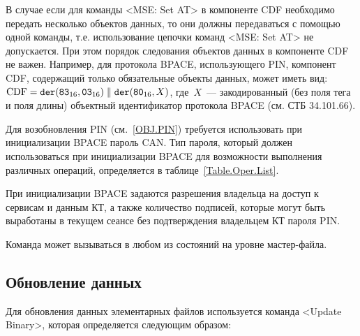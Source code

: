 В случае если для команды <MSE: Set AT> в компоненте CDF необходимо 
передать несколько объектов данных, то они должны передаваться с помощью 
одной команды, т.е. использование цепочки команд <MSE: Set AT> не 
допускается. При этом порядок следования объектов данных в компоненте CDF 
не важен. Например, для протокола BPACE, использующего PIN, компонент CDF, 
содержащий только обязательные объекты данных, может иметь вид: 
$\text{CDF} = 
\texttt{der}(\texttt{83}_{16}, \texttt{03}_{16}) \parallel 
\texttt{der}(\texttt{80}_{16}, X)$, где~$X$~--- закодированный (без поля тега и 
поля длины) объектный идентификатор протокола BPACE (см. СТБ 34.101.66). 


Для возобновления PIN (см.~\ref{OBJ.PIN}) требуется 
использовать при инициализации BPACE пароль CAN. 
Тип пароля, который должен использоваться при 
инициализации BPACE для возможности выполнения различных 
операций, определяется в таблице~\ref{Table.Oper.List}.

При инициализации BPACE задаются разрешения 
владельца на доступ к сервисам и данным  
КТ, а также количество подписей, которые могут быть выработаны 
в текущем сеансе без подтверждения владельцем КТ пароля PIN.

Команда может вызываться в любом из состояний на уровне мастер-файла.

\subsection{Обновление данных}
\label{Oper.Descr.Update}

Для обновления данных элементарных файлов используется
команда <Update Binary>, 
которая определяется следующим образом:

